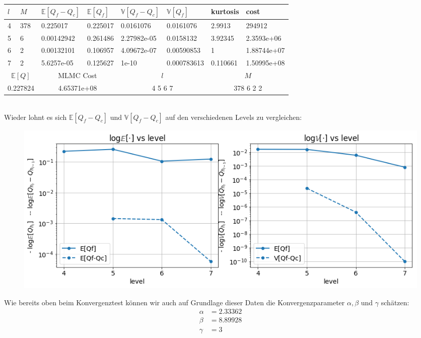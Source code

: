 \newlength\q
\setlength{}
\noindent\begin{tabular}{|p{0.15\q}|p{0.55\q}|p{1.4\q}|p{1.05\q}|p{1.35\q}|p{1.25\q}|p{0.9\q}|p{1.35\q}|}
	\hline
	$ l $   &  $ M $  &  $ \mathbb{E}[Q_f-Q_c] $  &   $ \mathbb{E}[Q_f] $ &  $ \mathbb{V}[Q_f-Q_c] $   &   $ \mathbb{V}[Q_f] $ &  kurtosis    &    cost\\
	\hline
	4 &  378 &   0.225017  &  0.225017 &  0.0161076 &  0.0161076  &    2.9913&      294912 \\
	5 &    6 & 0.00142942  &  0.261486 &2.27982e-05 &  0.0158132  &   3.92345&  2.3593e+06 \\
	6 &    2 & 0.00132101  &  0.106957 &4.09672e-07 & 0.00590853  &         1& 1.88744e+07 \\
	7 &    2 & 5.6257e-05  &  0.125627 &      1e-10 &0.000783613  &  0.110661& 1.50995e+08 \\
	\hline
	\multicolumn{2}{|c|}{$ \mathbb{E}[Q] $ }  &  \multicolumn{2}{c|}{MLMC Cost}   & \multicolumn{2}{c|}{$ l $}  &    \multicolumn{2}{c|}{$ M$} \\
	\hline
	\multicolumn{2}{|c|}{0.227824} & \multicolumn{2}{c|}{4.65371e+08  } &  \multicolumn{2}{c|}{   4 5 6 7}     & \multicolumn{2}{c|}{  378 6 2 2}    \\
	\hline 
\end{tabular}\\
Wieder lohnt es sich $ \mathbb{E}[Q_f-Q_c] $ und $ \mathbb{V}[Q_f-Q_c] $ auf den verschiedenen Levels zu vergleichen:
\begin{figure}[H]
	\centering
	\includegraphics[width=\textwidth]{plots/eps001.png} 
\end{figure}
Wie bereits oben beim Konvergenztest können wir auch auf Grundlage dieser Daten die Konvergenzparameter $ \alpha, \beta $ und  $ \gamma $ schätzen:
\begin{align*}
\alpha  &=     2.33362   \\
\beta   &=    8.89928   \\
\gamma  &=    3  \\
\end{align*}

